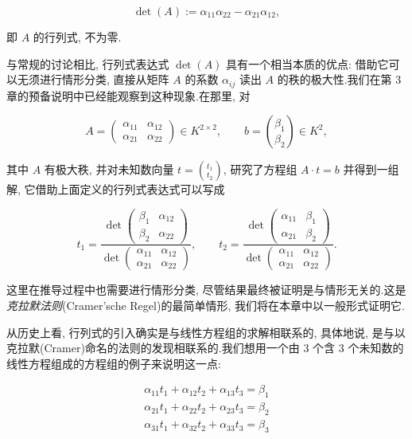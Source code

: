\[
\det(A) := \alpha_{11} \alpha_{22} - \alpha_{21} \alpha_{12},
\]

即 $A$ 的行列式, 不为零.

与常规的讨论相比, 行列式表达式 $\det(A)$ 具有一个相当本质的优点: 借助它可以无须进行情形分类, 直接从矩阵 $A$ 的系数 $\alpha_{ij}$ 读出 $A$ 的秩的极大性.我们在第 3 章的预备说明中已经能观察到这种现象.在那里, 对

\[
A = \begin{pmatrix} \alpha_{11} & \alpha_{12} \\ \alpha_{21} & \alpha_{22} \end{pmatrix} \in K^{2 \times 2}, \qquad b = \binom{\beta_1}{\beta_2} \in K^2,
\]

其中 $A$ 有极大秩, 并对未知数向量 $t = \binom{t_1}{t_2}$, 研究了方程组 $A \cdot t = b$ 并得到一组解, 它借助上面定义的行列式表达式可以写成

\[
t_1 = \frac{\det\begin{pmatrix} \beta_1 & \alpha_{12} \\ \beta_2 & \alpha_{22} \end{pmatrix}}{\det\begin{pmatrix} \alpha_{11} & \alpha_{12} \\ \alpha_{21} & \alpha_{22} \end{pmatrix}}, \qquad t_2 = \frac{\det\begin{pmatrix} \alpha_{11} & \beta_1 \\ \alpha_{21} & \beta_2 \end{pmatrix}}{\det\begin{pmatrix} \alpha_{11} & \alpha_{12} \\ \alpha_{21} & \alpha_{22} \end{pmatrix}}.
\]

这里在推导过程中也需要进行情形分类, 尽管结果最终被证明是与情形无关的.这是\emph{克拉默法则}(\textup{Cramer'sche Regel})的最简单情形, 我们将在本章中以一般形式证明它.

从历史上看, 行列式的引入确实是与线性方程组的求解相联系的, 具体地说, 是与以克拉默(Cramer)命名的法则的发现相联系的.我们想用一个由 $3$ 个含 $3$ 个未知数的线性方程组成的方程组的例子来说明这一点:

\[
\begin{array}{l}
\alpha_{11} t_1 + \alpha_{12} t_2 + \alpha_{13} t_3 = \beta_1 \\
\alpha_{21} t_1 + \alpha_{22} t_2 + \alpha_{23} t_3 = \beta_2 \\
\alpha_{31} t_1 + \alpha_{32} t_2 + \alpha_{33} t_3 = \beta_3
\end{array}
\]

